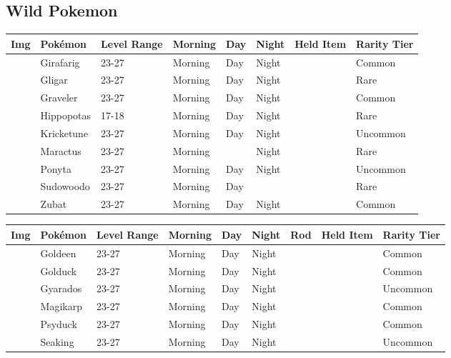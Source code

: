 \subsection{Wild Pokemon}%
\label{subsec:WildPokemon}%
\begin{longtable}{||l l l l l l l l||}%
\hline%
Img&Pokémon&Level Range&Morning&Day&Night&Held Item&Rarity Tier\\%
\hline%
\endhead%
\hline%
&Girafarig&23{-}27&Morning&Day&Night&&Common\\%
\hline%
&Gligar&23{-}27&Morning&Day&Night&&Rare\\%
\hline%
&Graveler&23{-}27&Morning&Day&Night&&Common\\%
\hline%
&Hippopotas&17{-}18&Morning&Day&Night&&Rare\\%
\hline%
&Kricketune&23{-}27&Morning&Day&Night&&Uncommon\\%
\hline%
&Maractus&23{-}27&Morning&&Night&&Rare\\%
\hline%
&Ponyta&23{-}27&Morning&Day&Night&&Uncommon\\%
\hline%
&Sudowoodo&23{-}27&Morning&Day&&&Rare\\%
\hline%
&Zubat&23{-}27&Morning&Day&Night&&Common\\%
\hline%
\end{longtable}%
\begin{longtable}{||l l l l l l l l l||}%
\hline%
Img&Pokémon&Level Range&Morning&Day&Night&Rod&Held Item&Rarity Tier\\%
\hline%
\endhead%
\hline%
&Goldeen&23{-}27&Morning&Day&Night&&&Common\\%
\hline%
&Golduck&23{-}27&Morning&Day&Night&&&Common\\%
\hline%
&Gyarados&23{-}27&Morning&Day&Night&&&Uncommon\\%
\hline%
&Magikarp&23{-}27&Morning&Day&Night&&&Common\\%
\hline%
&Psyduck&23{-}27&Morning&Day&Night&&&Common\\%
\hline%
&Seaking&23{-}27&Morning&Day&Night&&&Uncommon\\%
\hline%
\end{longtable}